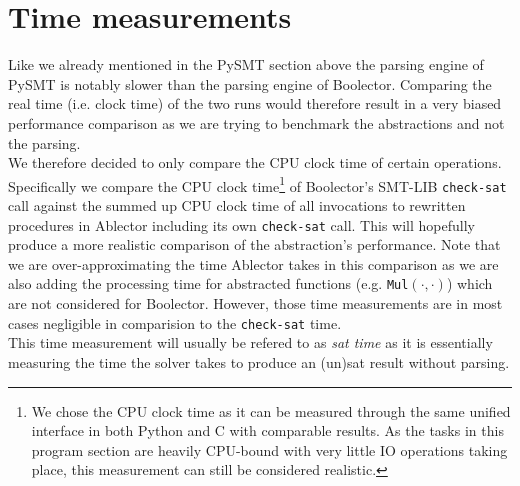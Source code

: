 \section{Time measurements}
Like we already mentioned in the PySMT section above the parsing engine of PySMT is notably slower than the parsing engine of Boolector.
Comparing the real time (i.e. clock time) of the two runs would therefore result in a very biased performance comparison as we are trying
to benchmark the abstractions and not the parsing.\\
We therefore decided to only compare the CPU clock time of certain operations.
Specifically we compare the CPU clock time\footnote{We chose the CPU clock time as it can be measured through the same unified interface in both Python and C with comparable results. As the tasks in this program section are heavily CPU-bound with very little IO operations taking place, this measurement can still be considered realistic.} of Boolector's SMT-LIB \texttt{check-sat} call
against the summed up CPU clock time of all invocations to rewritten procedures in Ablector including its own \texttt{check-sat} call.
This will hopefully produce a more realistic comparison of the abstraction's performance.
Note that we are over-approximating the time Ablector takes in this comparison as we are
also adding the processing time for abstracted functions (e.g. \texttt{Mul$\left(\cdot,\cdot\right)$}) which are not considered for Boolector.
However, those time measurements are in most cases negligible in comparision to the \texttt{check-sat} time.\\
This time measurement will usually be refered to as \textit{sat time} as it is essentially measuring the time the solver takes to produce an (un)sat result without parsing.
